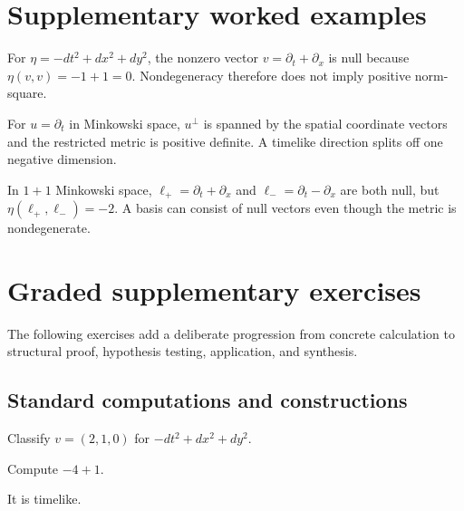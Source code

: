 \section{Supplementary worked examples}
\label{sec:vii29-pedagogy}

\begin{example}\label{ex:vii29-ped-01}
For \(\eta=-dt^2+dx^2+dy^2\), the nonzero vector \(v=\partial_t+\partial_x\) is null because \(\eta(v,v)=-1+1=0\).  Nondegeneracy therefore does not imply positive norm-square.
\end{example}

\begin{example}\label{ex:vii29-ped-02}
For \(u=\partial_t\) in Minkowski space, \(u^\perp\) is spanned by the spatial coordinate vectors and the restricted metric is positive definite.  A timelike direction splits off one negative dimension.
\end{example}

\begin{example}\label{ex:vii29-ped-03}
In \(1+1\) Minkowski space, \(\ell_+=\partial_t+\partial_x\) and \(\ell_-=\partial_t-\partial_x\) are both null, but \(\eta(\ell_+,\ell_-)=-2\).  A basis can consist of null vectors even though the metric is nondegenerate.
\end{example}

\section{Graded supplementary exercises}
The following exercises add a deliberate progression from concrete calculation to structural proof, hypothesis testing, application, and synthesis.

\subsection*{Standard computations and constructions}

\begin{exercise}\label{exr:vii29-ped-01}
Classify \(v=(2,1,0)\) for \(-dt^2+dx^2+dy^2\).
\end{exercise}

\begin{hint}
Compute \(-4+1\).
\end{hint}

\begin{solution}
It is timelike.
\end{solution}

